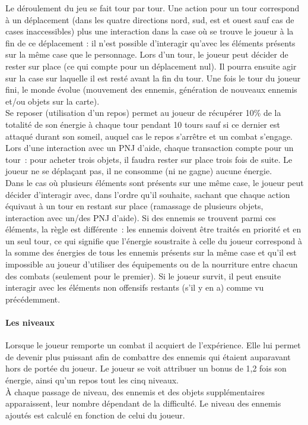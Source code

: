 \documentclass[11pt]{article}
\begin{document}
Le déroulement du jeu se fait tour par tour. Une action pour un tour correspond à un déplacement (dans les quatre directions nord, sud, est et ouest sauf cas de cases inaccessibles) plus une interaction dans la case où se trouve le joueur à la fin de ce déplacement : il n'est possible d’interagir qu'avec les éléments présents sur la même case que le personnage. Lors d'un tour, le joueur peut décider de rester sur place (ce qui compte pour un déplacement nul). Il pourra ensuite agir sur la case sur laquelle il est resté avant la fin du tour. Une fois le tour du joueur fini, le monde évolue (mouvement des ennemis, génération de nouveaux ennemis et/ou objets sur la carte).\\
Se reposer (utilisation d'un repos) permet au joueur de récupérer 10\% de la totalité de son énergie à chaque tour pendant 10 tours sauf si ce dernier est attaqué durant son someil, auquel cas le repos s'arrêtre et un combat s'engage.\\
Lors d'une interaction avec un PNJ d'aide, chaque transaction compte pour un tour~: pour acheter trois objets, il faudra rester sur place trois fois de suite. Le joueur ne se déplaçant pas, il ne consomme (ni ne gagne) aucune énergie.\\
Dans le cas où plusieurs éléments sont présents sur une même case, le joueur peut décider d’interagir avec, dans l'ordre qu'il souhaite, sachant que chaque action équivaut à un tour en restant sur place (ramassage de plusieurs objets, interaction avec un/des PNJ d'aide). Si des ennemis se trouvent parmi ces éléments, la règle est différente~: les ennemis doivent être traités en priorité et en un seul tour, ce qui signifie que l'énergie soustraite à celle du joueur correspond à la somme des énergies de tous les ennemis présents sur la même case et qu'il est impossible au joueur d'utiliser des équipements ou de la nourriture entre chacun des combats (seulement pour le premier). Si le joueur survit, il peut ensuite interagir avec les éléments non offensifs restants (s'il y en a) comme vu précédemment.

\paragraph{Les niveaux}

Lorsque le joueur remporte un combat il acquiert de l’expérience. Elle lui permet de devenir plus puissant afin de combattre des ennemis qui étaient auparavant hors de portée du joueur.
Le joueur se voit attribuer un bonus de 1,2 fois son énergie, ainsi qu'un repos tout les cinq niveaux.\\
À chaque passage de niveau, des ennemis et des objets supplémentaires apparaissent, leur nombre dépendant de la difficulté. Le niveau des ennemis ajoutés est calculé en fonction de celui du joueur.
\end{document}
